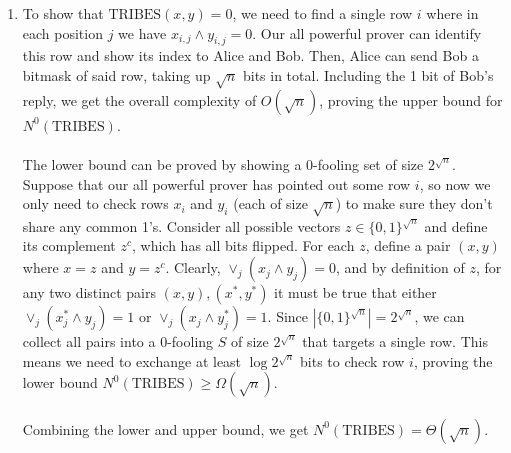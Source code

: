 \documentclass{article}
\begin{document}
\begin{enumerate}
\begin{enumerate}[label=(\alph*)]
            \item To show that $\textrm{TRIBES}(x,y) = 0$, we need to find a
                single row $i$ where in each position $j$ we have $x_{i,j}
                \land y_{i,j} = 0$. Our all powerful prover can identify this
                row and show its index to Alice and Bob. Then, Alice can send
                Bob a bitmask of said row, taking up $\sqrt{n}$ bits in total.
                Including the 1 bit of Bob's reply, we get the overall
                complexity of $O(\sqrt{n})$, proving the upper bound for
                $N^0(\textrm{TRIBES})$.
                \\\\
                The lower bound can be proved by showing a 0-fooling set of
                size $2^\sqrt{n}$. Suppose that our all powerful prover has
                pointed out some row $i$, so now we only need to check rows
                $x_i$ and $y_i$ (each of size $\sqrt{n}$) to make sure they
                don't share any common 1's. Consider all possible vectors $z
                \in \{0, 1\}^{\sqrt{n}}$ and define its complement $z^c$, which
                has all bits flipped. For each $z$, define a pair $(x,y)$ where
                $x = z$ and $y = z^c$. Clearly, $\lor_j(x_j \land y_j) = 0$,
                and by definition of $z$, for any two distinct pairs $(x, y),
                (x^*, y^*)$ it must be true that either $\lor_j(x^*_j \land
                y_j) = 1$ or $\lor_j(x_j \land y^*_j) = 1$. Since $|\{0,
                1\}^{\sqrt{n}}| = 2^{\sqrt{n}}$, we can collect all pairs into
                a 0-fooling $S$ of size $2^{\sqrt{n}}$ that targets a single
                row. This means we need to exchange at least $\log 2^\sqrt{n}$
                bits to check row $i$, proving the lower bound
                $N^0(\textrm{TRIBES}) \geq \Omega(\sqrt{n})$.
                \\\\
                Combining the lower and upper bound, we get
                $N^0(\textrm{TRIBES}) = \Theta(\sqrt{n})$.
                \\
        \end{enumerate}


\end{enumerate}
\end{document}
